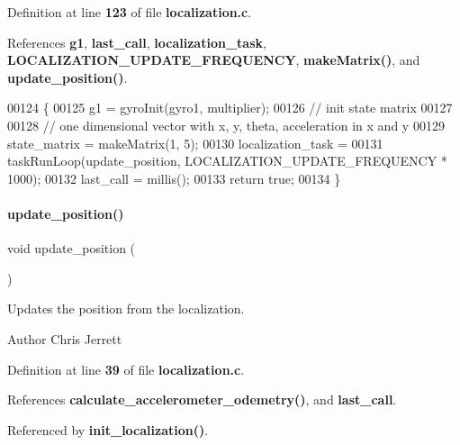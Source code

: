 Definition at line \textbf{ 123} of file \textbf{ localization.\+c}.



References \textbf{ g1}, \textbf{ last\+\_\+call}, \textbf{ localization\+\_\+task}, \textbf{ L\+O\+C\+A\+L\+I\+Z\+A\+T\+I\+O\+N\+\_\+\+U\+P\+D\+A\+T\+E\+\_\+\+F\+R\+E\+Q\+U\+E\+N\+CY}, \textbf{ make\+Matrix()}, and \textbf{ update\+\_\+position()}.


\begin{DoxyCode}
00124                                                                   \{
00125   g1 = gyroInit(gyro1, multiplier);
00126   \textcolor{comment}{// init state matrix}
00127 
00128   \textcolor{comment}{// one dimensional vector with x, y, theta, acceleration in x and y}
00129   state_matrix = makeMatrix(1, 5);
00130   localization_task =
00131       taskRunLoop(update_position, LOCALIZATION_UPDATE_FREQUENCY * 1000);
00132   last_call = millis();
00133   \textcolor{keywordflow}{return} \textcolor{keyword}{true};
00134 \}
\end{DoxyCode}
\mbox{\label{a00032_afacd5e0b3d5e677df26a4402bbd9ec9e}} 
\paragraph{update\+\_\+position()}
{\footnotesize\ttfamily void update\+\_\+position (\begin{DoxyParamCaption}{ }\end{DoxyParamCaption})}



Updates the position from the localization. 

\begin{DoxyAuthor}{Author}
Chris Jerrett 
\end{DoxyAuthor}


Definition at line \textbf{ 39} of file \textbf{ localization.\+c}.



References \textbf{ calculate\+\_\+accelerometer\+\_\+odemetry()}, and \textbf{ last\+\_\+call}.



Referenced by \textbf{ init\+\_\+localization()}.


